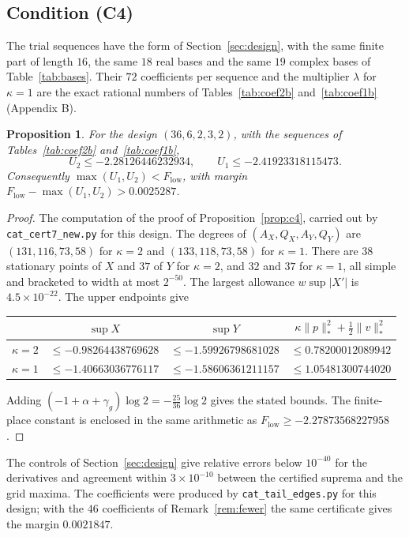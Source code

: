 \documentclass[11pt]{article}
\newtheorem{proposition}[theorem]{Proposition}
\theoremstyle{definition}
\begin{document}
\subsection{Condition (C4)}

The trial sequences have the form of Section~\ref{sec:design}, with the same finite part of length $16$, the same $18$ real bases and the same $19$ complex bases of Table~\ref{tab:bases}. Their $72$ coefficients per sequence and the multiplier $\lambda$ for $\kappa=1$ are the exact rational numbers of Tables~\ref{tab:coef2b} and~\ref{tab:coef1b} (Appendix B).

\begin{proposition}\label{prop:c4b}
For the design $(36,6,2,3,2)$, with the sequences of Tables~\ref{tab:coef2b} and~\ref{tab:coef1b},
\[
U_2\le-2.28126446232934,\qquad U_1\le-2.41923318115473 .
\]
Consequently $\max(U_1,U_2)<F_{\mathrm{low}}$, with margin $F_{\mathrm{low}}-\max(U_1,U_2)>0.0025287$.
\end{proposition}

\begin{proof}
The computation of the proof of Proposition~\ref{prop:c4}, carried out by \texttt{cat\_cert7\_new.py} for this design. The degrees of $(A_X,Q_X,A_Y,Q_Y)$ are $(131,116,73,58)$ for $\kappa=2$ and $(133,118,73,58)$ for $\kappa=1$. There are $38$ stationary points of $X$ and $37$ of $Y$ for $\kappa=2$, and $32$ and $37$ for $\kappa=1$, all simple and bracketed to width at most $2^{-50}$. The largest allowance $w\sup|X'|$ is $4.5\times10^{-22}$. The upper endpoints give
\begin{center}
\begin{tabular}{lccc}
\toprule
 & $\sup X$ & $\sup Y$ & $\kappa\|p\|_*^2+\frac12\|v\|_*^2$\\
\midrule
$\kappa=2$ & $\le-0.98264438769628$ & $\le-1.59926798681028$ & $\le0.78200012089942$\\
$\kappa=1$ & $\le-1.40663036776117$ & $\le-1.58606361211157$ & $\le1.05481300744020$\\
\bottomrule
\end{tabular}
\end{center}
Adding $(-1+\alpha+\gamma_g)\log2=-\frac{25}{36}\log2$ gives the stated bounds. The finite-place constant is enclosed in the same arithmetic as $F_{\mathrm{low}}\ge-2.27873568227958$.
\end{proof}

The controls of Section~\ref{sec:design} give relative errors below $10^{-40}$ for the derivatives and agreement within $3\times10^{-10}$ between the certified suprema and the grid maxima. The coefficients were produced by \texttt{cat\_tail\_edges.py} for this design; with the $46$ coefficients of Remark~\ref{rem:fewer} the same certificate gives the margin $0.0021847$.
\end{document}
